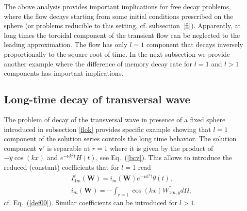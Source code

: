 \documentclass[aps,prx,twocolumn,amsmath,amssymb,amsfonts]{revtex4-2}
\begin{document}
The above analysis provides important implications for free decay problems, where the flow decays starting from some initial conditions prescribed on the sphere (or problems reducible to this setting, cf. subsection~\ref{fl}). Apparently, at long times the toroidal component of the transient flow can be neglected to the leading approximation. The flow has only $l=1$ component that decays inversely proportionally to the square root of time. In the next subsection we provide another example where the difference of memory decay rate for $l=1$ and $l>1$ components has important implications.


\subsection{Long-time decay of transversal wave} \label{transversal}

The problem of decay of the transversal wave in presence of a fixed sphere introduced in subsection \ref{flok} provides specific example showing that $l=1$ component of the solution series controls the long time behavior. The solution component $\bm v'$ is separable at $r=1$ where it is given by the product of $-{\hat y}\cos(kx)$ and $e^{-\nu k^2 t} H(t)$, see Eq.~(\ref{bcv}). This allows to introduce the reduced (constant) coefficients that for $l=1$ read
\begin{eqnarray}
&& I^{t}_{1m}(\bm W) = i_m(\bm W)e^{-\nu k^2 t}\theta(t),\nonumber \\
&& i_m(\bm W)=-\int_{r=1} \cos(kx) W_{1m, y}^* d\Omega, \label{ilm}
\end{eqnarray}
cf. Eq.~(\ref{def00}). Similar coefficients can be introduced for $l>1$.
\end{document}
